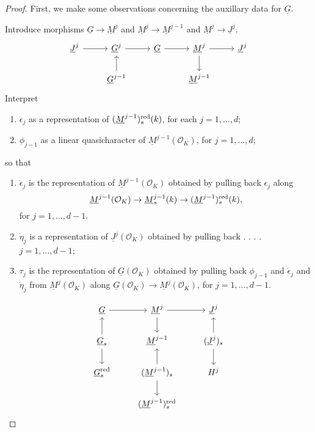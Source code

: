 \documentclass[10pt]{amsart}
\theoremstyle{plain}
\theoremstyle{definition}
\newcommand{\OK}{\mathcal{O}_K}
\newcommand{\Fq}{k}
\begin{document}
\begin{proof}
First, we make some observations concerning the auxillary data for $\underline{G}$. 

Introduce morphisms $\underline{G}\to \underline{M}^j$ and $\underline{M}^{j} \to \underline{M}^{j-1}$ and $\underline{M}^j \to \underline{J}^j$.
\[
\begin{tikzcd}
\underline{J}^j \arrow{r} & \underline{G}^{j} \arrow{r} 
& \underline{G} \arrow{r}  
& \underline{M}^{j} \arrow{d} \arrow{r} & \underline{J}^j \\
& \arrow{u} \underline{G}^{j-1} 
&
& \underline{M}^{j-1}
&
\end{tikzcd}
\]
Interpret 
\begin{enumerate}
\item
	$\epsilon_j$ as a representation of $(\underline{M}^{j-1})_s\red(\Fq)$, for each $j=1,\ldots, d$;
\item
	$\phi_{j-1}$ as a linear quasicharacter of $\underline{M}^{j-1}(\OK)$, for $j=1,\ldots, d$;
\end{enumerate}
so that
\begin{enumerate}
\item 
	$\dot{\epsilon}_j$ is the representation of $\underline{M}^{j-1}(\OK)$ obtained by pulling back $\epsilon_j$ along 
\[\underline{M}^{j-1}(\OK) \to \underline{M}^{j-1}_s(\Fq) \to (\underline{M}^{j-1})_s\red(\Fq),\]
for $j=1,\ldots, d-1$.
\item
	$\dot{\eta}_j$ is a representation of $\underline{J}^{j}(\OK)$ obtained by pulling back  . . . .  $j=1,\ldots, d-1$;
\item
	$\tau_j$ is the representation of $\underline{G}(\OK)$ obtained by pulling back  $\phi_{j-1}$ and $\dot{\epsilon}_j$ and $\dot{\eta}_j$ from $\underline{M}^{j}(\OK)$ along $\underline{G}(\OK)\to \underline{M}^j(\OK)$, for $j=1,\ldots, d-1$. 
\end{enumerate}

\[
\begin{tikzcd}
\underline{G} \arrow{r}  
& \underline{M}^{j} \arrow{d} \arrow{r} & \underline{J}^j \\
\underline{G}_s \arrow{u} \arrow{d}
& \underline{M}^{j-1}
 & (\underline{J}^j)_s \arrow{u} \arrow{d} \\
\underline{G}_s\red & (\underline{M}^{j-1})_s \arrow{u} \arrow{d} & H^j \\
& (\underline{M}^{j-1})_s\red & 
\end{tikzcd}
\]


\end{proof}
\end{document}
